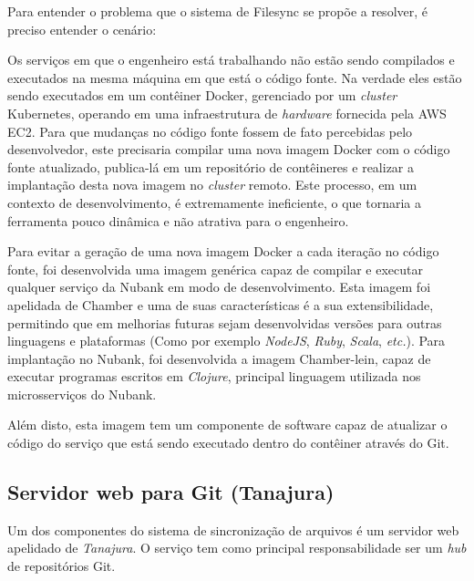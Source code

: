 	Para entender o problema que o sistema de Filesync se propõe a resolver, é preciso entender o cenário:
	
	Os serviços em que o engenheiro está trabalhando não estão sendo compilados e executados na mesma máquina em que está o código fonte. Na verdade eles estão sendo executados em um contêiner Docker, gerenciado por um \textit{cluster} Kubernetes, operando em uma infraestrutura de \textit{hardware} fornecida pela AWS EC2. Para que mudanças no código fonte fossem de fato percebidas pelo desenvolvedor, este precisaria compilar uma nova imagem Docker com o código fonte atualizado, publica-lá em um repositório de contêineres e realizar a implantação desta nova imagem no \textit{cluster} remoto. Este processo, em um contexto de desenvolvimento, é extremamente ineficiente, o que tornaria a ferramenta pouco dinâmica e não atrativa para o engenheiro.

	Para evitar a geração de uma nova imagem Docker a cada iteração no código fonte, foi desenvolvida uma imagem genérica capaz de compilar e executar qualquer serviço da Nubank em modo de desenvolvimento. Esta imagem foi apelidada de Chamber e uma de suas características é a sua extensibilidade, permitindo que em melhorias futuras sejam desenvolvidas versões para outras linguagens e plataformas (Como por exemplo \textit{NodeJS}, \textit{Ruby}, \textit{Scala}, \textit{etc.}). Para implantação no Nubank, foi desenvolvida a imagem Chamber-lein, capaz de executar programas escritos em \textit{Clojure}, principal linguagem utilizada nos microsserviços do Nubank.
	
	Além disto, esta imagem tem um componente de software capaz de atualizar o código do serviço que está sendo executado dentro do contêiner através do Git.
	
	
	\subsection{Servidor web para Git (Tanajura)}
	Um dos componentes do sistema de sincronização de arquivos é um servidor web apelidado de \textit{Tanajura}. O serviço tem como principal responsabilidade ser um \textit{hub} de repositórios Git.
	
